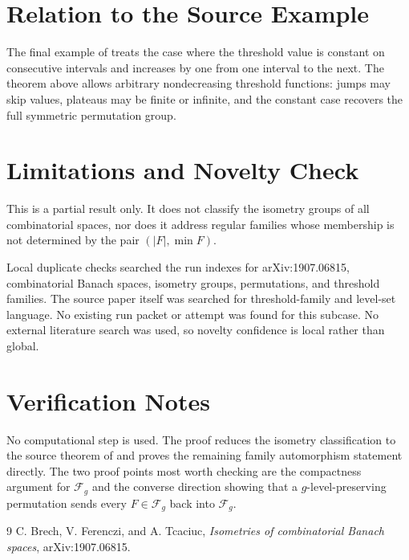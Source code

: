 \documentclass[11pt]{article}
\newcommand{\F}{\mathcal{F}}
\begin{document}
\section*{Relation to the Source Example}

The final example of \cite{BFT} treats the case where the threshold value is
constant on consecutive intervals and increases by one from one interval to
the next.  The theorem above allows arbitrary nondecreasing threshold
functions: jumps may skip values, plateaus may be finite or infinite, and the
constant case recovers the full symmetric permutation group.

\section*{Limitations and Novelty Check}

This is a partial result only.  It does not classify the isometry groups of
all combinatorial spaces, nor does it address regular families whose
membership is not determined by the pair $(|F|,\min F)$.

Local duplicate checks searched the run indexes for arXiv:1907.06815,
combinatorial Banach spaces, isometry groups, permutations, and threshold
families.  The source paper itself was searched for threshold-family and
level-set language.  No existing run packet or attempt was found for this
subcase.  No external literature search was used, so novelty confidence is
local rather than global.

\section*{Verification Notes}

No computational step is used.  The proof reduces the isometry classification
to the source theorem of \cite{BFT} and proves the remaining family
automorphism statement directly.  The two proof points most worth checking are
the compactness argument for $\F_g$ and the converse direction showing that a
$g$-level-preserving permutation sends every $F\in\F_g$ back into $\F_g$.

\begin{thebibliography}{9}
C. Brech, V. Ferenczi, and A. Tcaciuc,
\emph{Isometries of combinatorial Banach spaces},
arXiv:1907.06815.
\end{thebibliography}
\end{document}
